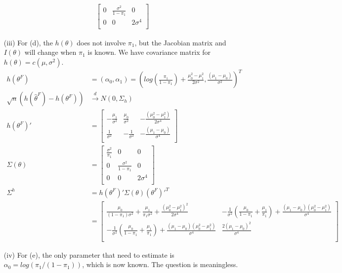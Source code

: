 \documentclass[11pt]{article} %
\begin{document}
\begin{itemize}
\begin{align*}
\begin{bmatrix}
				0 & \frac{\sigma^2}{ 1-\pi_1} & 0\\
				0 & 0 & 2\sigma^4 \\
			\end{bmatrix}
		\end{align*} 
		\item[(iii)] For (d), the $h(\theta)$ does not involve $\pi_1$, but the Jacobian matrix and $I(\theta)$ will change when $\pi_1$ is known. We have covariance matrix for $h(\theta) = c(\mu, \sigma^2)$.
		\begin{align*}    
			h(\theta^F ) &= (\alpha_0, \alpha_1)= \left(log(\frac{\pi_1}{1-\pi_1}) +\frac{\mu_0^2 - \mu_1^2}{2\sigma^2},  \frac{(\mu_1-\mu_0)}{\sigma^2} \right)^T\\
			\sqrt{n} (h(\hat\theta^F ) - h(\theta^F )) & \xrightarrow[]{d} N \left(0, \Sigma_ h \right)\\
			h(\theta^F )' &= \begin{bmatrix}
				-\frac{\mu_1}{\sigma^2} & \frac{\mu_0}{\sigma^2} &-\frac{(\mu_0^2 - \mu_1^2)}{2\sigma^4}\\
				\frac{1}{\sigma^2} & -\frac{1}{\sigma^2} & -\frac{(\mu_1-\mu_0)}{\sigma^4}\\
			\end{bmatrix}\\
			\Sigma(\theta) &= \begin{bmatrix}
				\frac{\sigma^2}{ \pi_1} & 0 & 0\\
				0 & \frac{\sigma^2}{ 1-\pi_1} & 0\\
				0 & 0 & 2\sigma^4 \\
			\end{bmatrix}\\
			\Sigma^{h} &= h(\theta^F )'\Sigma(\theta) (\theta^F )'^T\\
			&= \begin{bmatrix}
				\frac{\mu_0}{(1-\pi_1)\sigma^2} + \frac{\mu_1}{\pi_1\sigma^2} + \frac{(\mu_0^2 - \mu_1^2)^2}{2\sigma^4} & -\frac{1}{\sigma^2}(\frac{\mu_0}{1-\pi_1} + \frac{\mu_1}{\pi_1}) + \frac{(\mu_1-\mu_0)(\mu_0^2- \mu_1^2)}{\sigma^4} \\
				-\frac{1}{\sigma^2}(\frac{\mu_0}{1-\pi_1} + \frac{\mu_1}{\pi_1}) + \frac{(\mu_1-\mu_0)(\mu_0^2- \mu_1^2)}{\sigma^4}  &  \frac{2(\mu_1-\mu_0)^2}{\sigma^4}\\
			\end{bmatrix}
		\end{align*}
		\item[(iv)] For (e), the only parameter that need to estimate is $\alpha_0 = log(\pi_1/(1-\pi_1))$, which is now known. The question is meaningless. 
	\end{itemize}
\end{document}

